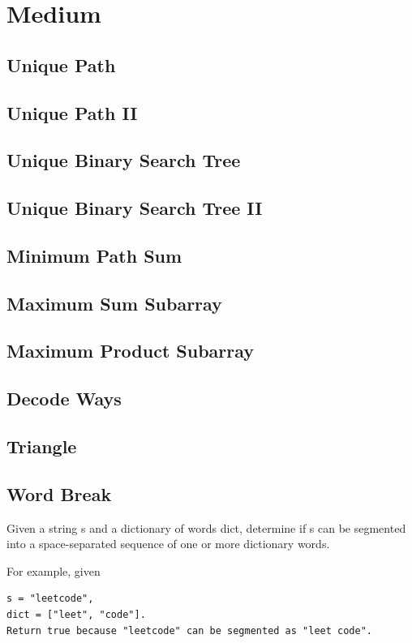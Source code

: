 \documentclass[11pt]{book}
\begin{document}
\section{Medium}
\label{sec-14-2}
\subsection{Unique Path}
\label{sec-14-2-1}
\subsection{Unique Path II}
\label{sec-14-2-2}
\subsection{Unique Binary Search Tree}
\label{sec-14-2-3}
\subsection{Unique Binary Search Tree II}
\label{sec-14-2-4}
\subsection{Minimum Path Sum}
\label{sec-14-2-5}
\subsection{Maximum Sum Subarray}
\label{sec-14-2-6}
\subsection{Maximum Product Subarray}
\label{sec-14-2-7}
\subsection{Decode Ways}
\label{sec-14-2-8}
\subsection{Triangle}
\label{sec-14-2-9}
\subsection{Word Break}
\label{sec-14-2-10}
Given a string s and a dictionary of words dict, determine if s can be segmented into a space-separated sequence of one or more dictionary words.

For example, given
\lstset{language=java,label= ,caption= ,numbers=none}
\begin{lstlisting}
s = "leetcode",
dict = ["leet", "code"].
Return true because "leetcode" can be segmented as "leet code".
\end{lstlisting}
\end{document}
